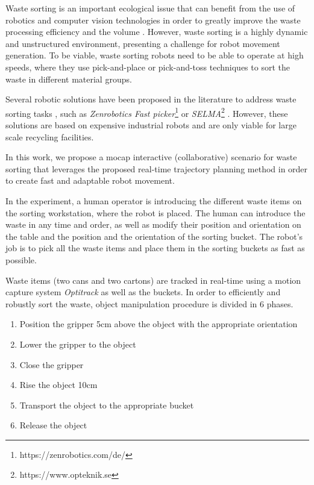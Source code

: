 Waste sorting is an important ecological issue that can benefit from the use of robotics and computer vision technologies in order to greatly improve the waste processing efficiency and the volume \cite{Koskinopoulou2021}. However, waste sorting is a highly dynamic and unstructured environment, presenting a challenge for robot movement generation.
To be viable, waste sorting robots need to be able to operate at high speeds, where they use pick-and-place or pick-and-toss \cite{Hassan2022} techniques to sort the waste in different material groups.

Several robotic solutions have been proposed in the literature to address waste sorting tasks \cite{SARC2019}, such as \textit{Zenrobotics Fast picker}\footnote{https://zenrobotics.com/de/} or \textit{SELMA}\footnote{https://www.opteknik.se} . However, these solutions are based on expensive industrial robots and are only viable for large scale recycling facilities.

In this work, we propose a mocap interactive (collaborative) scenario for waste sorting that leverages the proposed real-time trajectory planning method in order to create fast and adaptable robot movement. 

In the experiment, a human operator is introducing the different waste items on the sorting workstation, where the robot is placed. The human can introduce the waste in any time and order, as well as modify their position and orientation on the table and the position and the orientation of the sorting bucket. The robot's job is to pick all the waste items and place them in the sorting buckets as fast as possible.

Waste items (two cans and two cartons) are tracked in real-time using a motion capture system \textit{Optitrack} as well as the buckets. In order to efficiently and robustly sort the waste, object manipulation procedure is divided in 6 phases.
\begin{enumerate}
    \item Position the gripper 5cm above the object with the appropriate orientation
    \item Lower the gripper to the object
    \item Close the gripper
    \item Rise the object 10cm
    \item Transport the object to the appropriate bucket
    \item Release the object
\end{enumerate}

